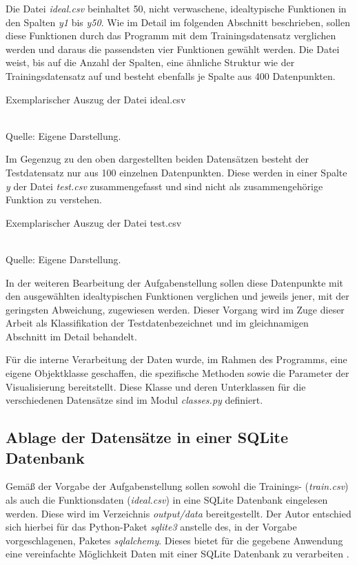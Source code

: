 Die Datei \emph{ideal.csv} beinhaltet 50, nicht \glqq verwaschene\grqq , idealtypische Funktionen in den Spalten \emph{y1} bis \emph{y50}. Wie im Detail im folgenden Abschnitt beschrieben, sollen diese Funktionen durch das Programm mit dem Trainingsdatensatz verglichen werden und daraus die passendsten vier Funktionen gewählt werden. Die Datei weist, bis auf die Anzahl der Spalten, eine ähnliche Struktur wie der Trainingsdatensatz auf und besteht ebenfalls je Spalte aus 400 Datenpunkten. 

\begin{table}[H]
\small
\centering
\caption{Exemplarischer Auszug der Datei ideal.csv}
\\
Quelle: Eigene Darstellung.
\label{tab:ideal.csv}
\end{table} 

Im Gegenzug zu den oben dargestellten beiden Datensätzen besteht der Testdatensatz nur aus 100 einzelnen Datenpunkten. Diese werden in einer Spalte \emph{y} der Datei \emph{test.csv} zusammengefasst und sind nicht als zusammengehörige Funktion zu verstehen. 

\begin{table}[H]
\small
\centering
\caption{Exemplarischer Auszug der Datei test.csv}
\\
Quelle: Eigene Darstellung.
\label{tab:test.csv}
\end{table} 

In der weiteren Bearbeitung der Aufgabenstellung sollen diese Datenpunkte mit den ausgewählten idealtypischen Funktionen verglichen und jeweils jener, mit der geringsten Abweichung, zugewiesen werden. Dieser Vorgang wird im Zuge dieser Arbeit als \glqq Klassifikation der Testdaten\grqq bezeichnet und im gleichnamigen Abschnitt im Detail behandelt.

Für die interne Verarbeitung der Daten wurde, im Rahmen des Programms, eine eigene Objektklasse geschaffen, die spezifische Methoden sowie die Parameter der Visualisierung bereitstellt. Diese Klasse und deren Unterklassen für die verschiedenen Datensätze sind im Modul \emph{classes.py} definiert.

\subsection{Ablage der Datensätze in einer SQLite Datenbank}

Gemäß der Vorgabe der Aufgabenstellung sollen sowohl die Trainings- (\emph{train.csv}) als auch die Funktionsdaten (\emph{ideal.csv}) in eine SQLite Datenbank eingelesen werden. Diese wird im Verzeichnis \emph{output/data} bereitgestellt. Der Autor entschied sich hierbei für das Python-Paket \emph{sqlite3} anstelle des, in der Vorgabe vorgeschlagenen, Paketes \emph{sqlalchemy}. Dieses bietet für die gegebene Anwendung eine vereinfachte Möglichkeit Daten mit einer SQLite Datenbank zu verarbeiten \citep{gosset_accessing_2017}.

